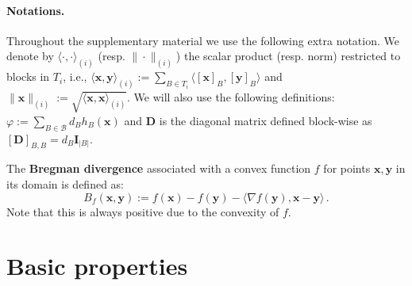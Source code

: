 \documentclass{article}
\def\xx{{\boldsymbol x}}
\def\yy{{\boldsymbol y}}
\def\DD{{\boldsymbol D}}
\renewcommand{\llbracket}{[}
\renewcommand{\rrbracket}{]}
\begin{document}
\vspace{2em}

\paragraph{Notations.} Throughout the supplementary material we use the following extra notation. We denote by $\langle \cdot, \cdot \rangle_{(i)}$ (resp. $\|\cdot\|_{(i)}$) the scalar product (resp. norm) restricted to blocks in $T_i$, i.e., $\langle \xx, \yy \rangle_{(i)} := \sum_{B \in T_i}\langle \llbracket\xx\rrbracket_B, \llbracket\yy\rrbracket_B \rangle$ and $\|\xx\|_{(i)} := \sqrt{\langle \xx, \xx\rangle_{(i)}}$.
We will also use the following definitions: $\varphi := \sum_{B \in \mathcal{B}} d_B h_B(\xx)$ and $\DD$ is the diagonal matrix defined block-wise as $\llbracket\DD\rrbracket_{B,B} = d_B \boldsymbol I_{|B|}$.


The {\bfseries Bregman divergence} associated with a convex function $f$ for points $\xx, \yy$ in its domain is defined as:
\begin{equation}
  B_f(\xx, \yy) := f(\xx) - f(\yy) - \langle \nabla f(\yy), \xx - \yy \rangle \,.
\end{equation}
  Note that this is always positive due to the convexity of $f$.

\section{Basic properties}
\end{document}
